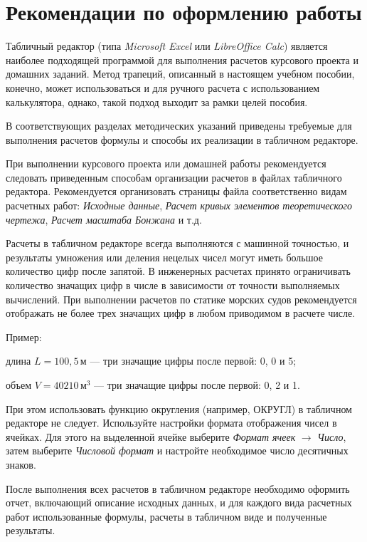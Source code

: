\section{Рекомендации по оформлению работы}

Табличный редактор (типа \textit{Microsoft Excel} или \textit{LibreOffice Calc}) является наиболее подходящей программой для выполнения расчетов курсового проекта и домашних заданий. 
Метод трапеций, описанный в настоящем учебном пособии, конечно, может использоваться и для ручного расчета с использованием калькулятора, однако, такой подход выходит за рамки целей пособия.

В соответствующих разделах методических указаний приведены требуемые для выполнения расчетов формулы и способы их реализации в табличном редакторе.

При выполнении курсового проекта или домашней работы рекомендуется следовать приведенным способам организации расчетов в файлах табличного редактора.
Рекомендуется организовать страницы файла соответственно видам расчетных работ: \textit{Исходные данные}, \textit{Расчет кривых элементов теоретического чертежа}, \textit{Расчет масштаба Бонжана} и т.д.

Расчеты в табличном редакторе всегда выполняются с машинной точностью, и результаты умножения или деления нецелых чисел могут иметь большое количество цифр после запятой.
В инженерных расчетах принято ограничивать количество значащих цифр в числе в зависимости от точности выполняемых вычислений.
При выполнении расчетов по статике морских судов рекомендуется отображать не более трех значащих цифр в любом приводимом в расчете числе.

Пример:

длина $L=100{,}5 \, \text{м}$ --- три значащие цифры после первой: 0, 0 и 5;

объем $V=40210 \, \text{м}^3$ --- три значащие цифры после первой: 0, 2 и 1.

При этом использовать функцию округления (например, ОКРУГЛ) в табличном редакторе не следует.
Используйте настройки формата отображения чисел в ячейках.
Для этого на выделенной ячейке выберите \textit{Формат ячеек} $\rightarrow$ \textit{Число}, затем выберите \textit{Числовой формат} и настройте необходимое число десятичных знаков.

После выполнения всех расчетов в табличном редакторе необходимо оформить отчет, включающий описание исходных данных, и для каждого вида расчетных работ использованные формулы, расчеты в табличном виде и полученные результаты.

